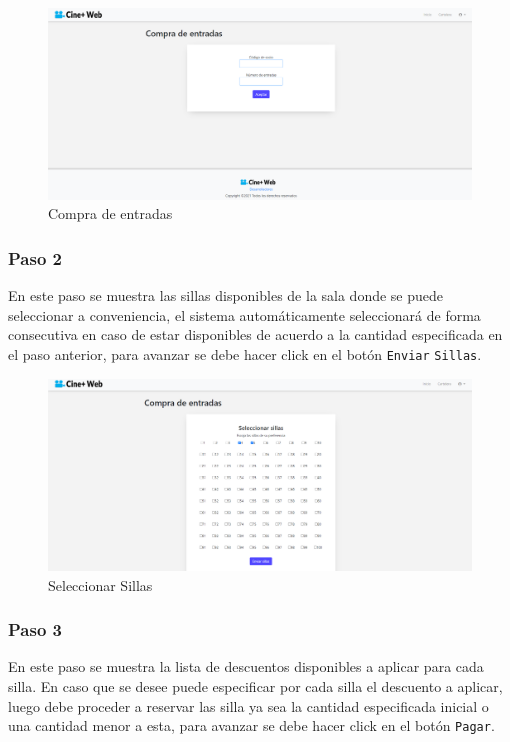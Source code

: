 \begin{figure}[h!]
	\centering
	\includegraphics[scale=0.35]{./chapters/img/ticketpurchase1.png}
	
	\label{fig:ticketpurchase1}
	\caption{Compra de entradas}
	
\end{figure}

\subsubsection{Paso 2}
En este paso se muestra las sillas disponibles de la sala donde se puede seleccionar a conveniencia, el sistema autom\'aticamente seleccionar\'a de forma consecutiva en caso de estar disponibles de acuerdo a la cantidad especificada en el paso anterior, para avanzar se debe hacer click en el bot\'on \verb*|Enviar| \verb*|Sillas|.

\begin{figure}[h!]
	\centering
	\includegraphics[scale=0.35]{./chapters/img/seat.png}
	
	\label{fig:seats}
	\caption{Seleccionar Sillas}
\end{figure}

\subsubsection{Paso 3}
En este paso se muestra la lista de descuentos disponibles a aplicar para cada silla. En caso que se desee puede especificar por cada silla el descuento a aplicar, luego debe proceder a reservar las silla ya sea la cantidad especificada inicial o una cantidad menor a esta, para avanzar se debe hacer click en el bot\'on \verb*|Pagar|.

